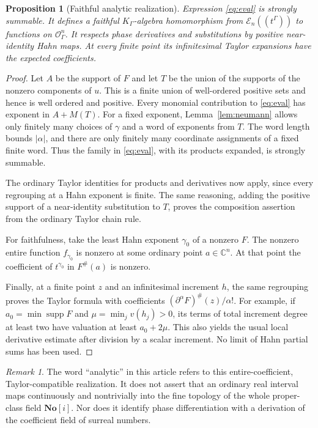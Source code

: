 \documentclass[11pt,letterpaper]{article}
\numberwithin{equation}{section}
\newtheorem{proposition}[theorem]{Proposition}
\theoremstyle{definition}
\theoremstyle{remark}
\newtheorem{remark}[theorem]{Remark}
\newcommand{\C}{\mathbb C}
\newcommand{\No}{\mathbf{No}}
\newcommand{\E}{\mathscr E}
\newcommand{\OO}{\mathcal O}
\newcommand{\supp}{\operatorname{supp}}
\newcommand{\HH}[1]{#1((t^\Gamma))}
\begin{document}
\begin{proposition}[Faithful analytic realization]\label{prop:eval}
Expression \eqref{eq:eval} is strongly summable. It defines a faithful
$K_\Gamma$-algebra homomorphism from $\HH{\E_n}$ to functions on
$\OO_\Gamma^n$. It respects phase derivatives and substitutions by
positive near-identity Hahn maps. At every finite point its infinitesimal
Taylor expansions have the expected coefficients.
\end{proposition}
\begin{proof}
Let $A$ be the support of $F$ and let $T$ be the union of the supports of the
nonzero components of $u$. This is a finite union of well-ordered positive
sets and hence is well ordered and positive. Every monomial contribution to
\eqref{eq:eval} has exponent in $A+M(T)$. For a fixed exponent,
Lemma~\ref{lem:neumann} allows only finitely many choices of $\gamma$ and a
word of exponents from $T$. The word length bounds $|\alpha|$, and there are
only finitely many coordinate assignments of a fixed finite word. Thus the
family in \eqref{eq:eval}, with its products expanded, is strongly summable.

The ordinary Taylor identities for products and derivatives now apply, since
every regrouping at a Hahn exponent is finite. The same reasoning, adding
the positive support of a near-identity substitution to $T$, proves the
composition assertion from the ordinary Taylor chain rule.

For faithfulness, take the least Hahn exponent $\gamma_0$ of a nonzero $F$.
The nonzero entire function $f_{\gamma_0}$ is nonzero at some ordinary point
$a\in\C^n$. At that point the coefficient of $t^{\gamma_0}$ in $F^\#(a)$ is
nonzero.

Finally, at a finite point $z$ and an infinitesimal increment $h$, the same
regrouping proves the Taylor formula with coefficients
$(\partial^\alpha F)^\#(z)/\alpha!$. For example, if $a_0=\min\supp F$ and
$\mu=\min_j v(h_j)>0$, its terms of total increment degree at least two have
valuation at least $a_0+2\mu$. This also yields the usual local derivative
estimate after division by a scalar increment. No limit of Hahn partial
sums has been used.
\end{proof}

\begin{remark}
The word ``analytic'' in this article refers to this entire-coefficient,
Taylor-compatible realization. It does not assert that an ordinary real
interval maps continuously and nontrivially into the fine topology of the
whole proper-class field $\No[i]$. Nor does it identify phase differentiation
with a derivation of the coefficient field of surreal numbers.
\end{remark}
\end{document}
